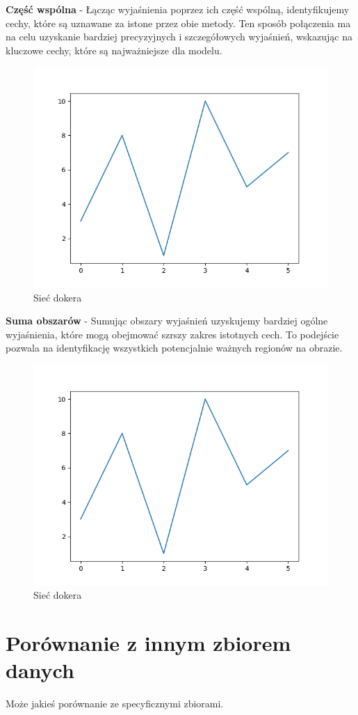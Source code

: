 \textbf{Część wspólna} - Łącząc wyjaśnienia poprzez ich część wspólną, identyfikujemy cechy, które są uznawane za istone przez obie metody.
Ten sposób połączenia ma na celu uzyskanie bardziej precyzyjnych i szczegółowych wyjaśnień, wskazując na kluczowe cechy, które są najważniejsze dla modelu.
\begin{figure}
  \centering\includegraphics[width=.6\textwidth]{images/example}
\caption{Sieć dokera \cite{docker_compose_reference}}  \label{rys:network}
\end{figure}

\textbf{Suma obszarów} - Sumując obszary wyjaśnień uzyskujemy bardziej ogólne wyjaśnienia, które mogą obejmować szrszy zakres istotnych cech.
To podejście pozwala na identyfikację wszystkich potencjalnie ważnych regionów na obrazie.
\begin{figure}
  \centering\includegraphics[width=.6\textwidth]{images/example}
\caption{Sieć dokera \cite{docker_compose_reference}}  \label{rys:network}
\end{figure}

\section*{Porównanie z innym zbiorem danych}

Może jakieś porównanie ze specyficznymi zbiorami.

